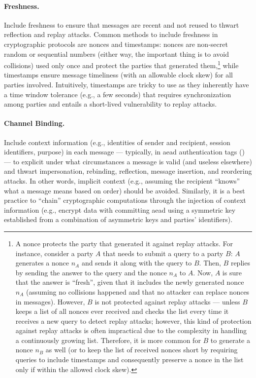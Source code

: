 \paragraph*{Freshness.} Include freshness to ensure that messages are recent and not reused to thwart reflection and replay attacks. Common methods to include freshness in cryptographic protocols are nonces and timestamps: nonces are non-secret random or sequential numbers (either way, the important thing is to avoid collisions) used only once and protect the parties that generated them,\footnote{A nonce protects the party that generated it against replay attacks. For instance, consider a party $A$ that needs to submit a query to a party $B$: $A$ generates a nonce $n_A$ and sends it along with the query to $B$. Then, $B$ replies by sending the answer to the query and the nonce $n_A$ to $A$. Now, $A$ is sure that the answer is ``fresh'', given that it includes the newly generated nonce $n_A$ (assuming no collisions happened and that no attacker can replace nonces in messages). However, $B$ is not protected against replay attacks --- unless $B$ keeps a list of all nonces ever received and checks the list every time it receives a new query to detect replay attacks; however, this kind of protection against replay attacks is often impractical due to the complexity in handling a continuously growing list. Therefore, it is more common for $B$ to generate a nonce $n_B$ as well (or to keep the list of received nonces short by requiring queries to include timestamps and consequently preserve a nonce in the list only if within the allowed clock skew).} while timestamps ensure message timeliness (with an allowable clock skew) for all parties involved. Intuitively, timestamps are tricky to use as they inherently have a time window tolerance (e.g., a few seconds) that requires synchronization among parties and entails a short-lived vulnerability to replay attacks.

\paragraph*{Channel Binding.} Include context information (e.g., identities of sender and recipient, session identifiers, purpose) in each message --- typically, in \gls{aead} authentication tags () --- to explicit under what circumstances a message is valid (and useless elsewhere) and thwart impersonation, rebinding, reflection, message insertion, and reordering attacks. In other words, implicit context (e.g., assuming the recipient ``knows'' what a message means based on order) should be avoided. Similarly, it is a best practice to ``chain'' cryptographic computations through the injection of context information (e.g., encrypt data with committing \gls{aead} using a symmetric key established from a combination of asymmetric keys and parties' identifiers).

